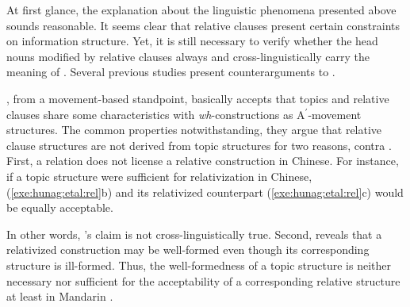 

At first glance, the explanation about the linguistic phenomena
presented above sounds reasonable.  It seems clear that relative
clauses present certain constraints on information structure. Yet, it
is still necessary to verify whether the head nouns modified by
relative clauses always and cross-linguistically carry the meaning of
. Several previous studies present counterarguments to
.



\citet{huang:etal:09}, from a movement-based
standpoint, basically accepts that topics and relative clauses share
some characteristics with \textit{wh}-constructions as
A$^\ensuremath{\prime}$-movement structures. The common properties
notwithstanding, they argue that relative clause structures are not
derived from topic structures for two reasons, contra \citet{kuno:76}.
First, a  relation does not license a relative construction in
Chinese.  For instance, if a topic structure were sufficient for
relativization in Chinese, (\ref{exe:hunag:etal:rel}b) and its
relativized counterpart (\ref{exe:hunag:etal:rel}c) would be equally
acceptable.




\noindent In other words, \citeauthor{kuno:76}'s claim
 is not cross-linguistically true.  Second,
\citet{ning:93} reveals that a relativized construction may be
well-formed even though its corresponding  structure is
ill-formed.  Thus, the well-formedness of a topic structure is neither
necessary nor sufficient for the acceptability of a corresponding
relative structure at least in Mandarin .


